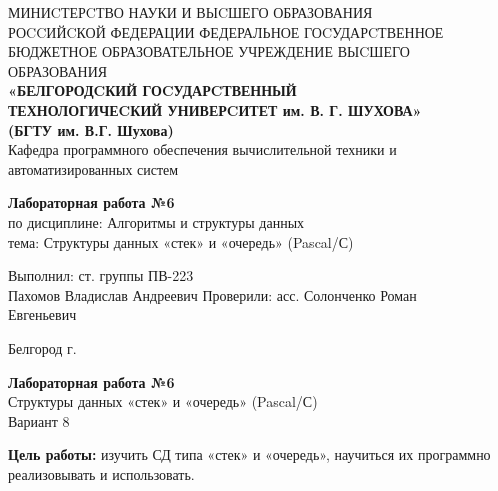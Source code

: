 \documentclass[a4paper,14pt]{extarticle}
\newcommand\textbox[1]{
	\parbox{.45\textwidth}{#1}
}
\begin{document}
\begin{center}
    \small{
        МИНИCТЕРCТВО НАУКИ И ВЫCШЕГО ОБРАЗОВАНИЯ \\РОCCИЙCКОЙ ФЕДЕРАЦИИ
        \bigbreak
        ФЕДЕРАЛЬНОЕ ГОCУДАРCТВЕННОЕ БЮДЖЕТНОЕ ОБРАЗОВАТЕЛЬНОЕ УЧРЕЖДЕНИЕ ВЫCШЕГО ОБРАЗОВАНИЯ \\
        \bigbreak
        \textbf{«БЕЛГОРОДCКИЙ ГОCУДАРCТВЕННЫЙ \\ТЕХНОЛОГИЧЕCКИЙ УНИВЕРCИТЕТ им. В. Г. ШУХОВА»\\ (БГТУ им. В.Г. Шухова)} \\
        \bigbreak
        Кафедра программного обеспечения вычислительной техники и автоматизированных систем\\}
\end{center}

\vfill
\begin{center}
    \large{
        \textbf{
            Лабораторная работа №6}}\\
    \normalsize{
        по дисциплине: Алгоритмы и структуры данных \\
        тема: Структуры данных «стек» и «очередь» (Pascal/С)}
\end{center}
\vfill
\hfill\textbox{
    Выполнил: ст. группы ПВ-223\\Пахомов Владислав Андреевич
    \bigbreak
    Проверили: асс. Солонченко Роман\\Евгеньевич
}
\vfill\begin{center}
    Белгород \the\year г.
\end{center}
\newpage
\begin{center}
    \textbf{Лабораторная работа №6}\\
    Структуры данных «стек» и «очередь» (Pascal/С)\\
    Вариант 8
\end{center}
\textbf{Цель работы: }изучить СД типа «стек» и «очередь», научиться их
программно реализовывать и использовать.
\end{document}
